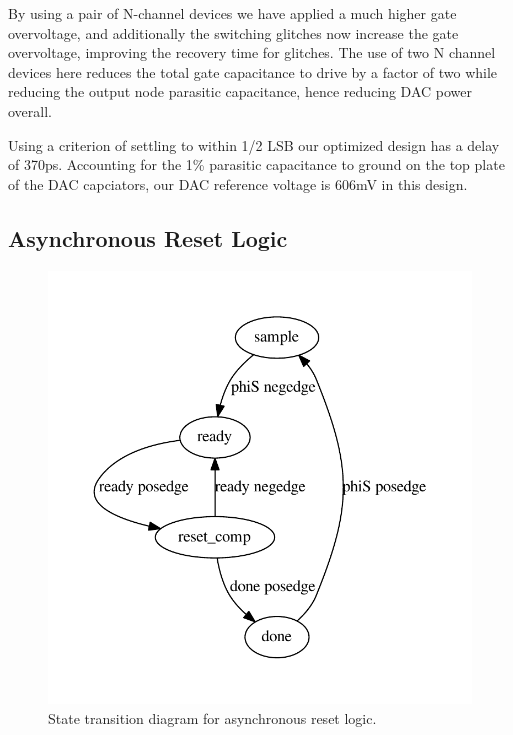 \documentclass[10pt,journal]{IEEEtran}\usepackage{longtable}
\begin{document}
By using a pair of N-channel devices we have applied a much higher gate overvoltage, and additionally the switching glitches now increase the gate overvoltage, improving the recovery time for glitches.
The use of two N channel devices here reduces the total gate capacitance to drive by a factor of two while reducing the output node parasitic capacitance, hence reducing DAC power overall.

Using a criterion of settling to within 1/2 LSB our optimized design has a delay of 370ps.
Accounting for the 1\% parasitic capacitance to ground on the top plate of the DAC capciators, our DAC reference voltage is 606mV in this design. 




\subsection{Asynchronous Reset Logic}

\begin{figure}[tb]
\begin{center}
\includegraphics[width=1\columnwidth]{async.pdf}
\caption{State transition diagram for asynchronous reset logic.}
\label{fig:AsyncStateMachine}
\end{center}
\end{figure}
\end{document}
